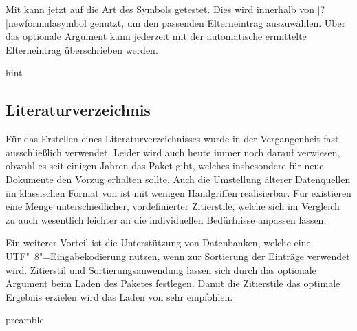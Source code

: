 \documentclass[%
  english,ngerman,%
  cdgeometry=no,DIV=12,%
  cd=false,cdfont=false,cdtitle=true,%
  headings=normal,%
  automark,%
  listof=toc,%
]{tudscrartcl}
\begin{document}
Mit  kann jetzt auf die Art des Symbols getestet. Dies 
wird innerhalb von \Macro|?|{newformulasymbol} genutzt, um den passenden 
Elterneintrag auszuwählen. Über das optionale Argument kann jederzeit mit 
 der automatische ermittelte 
Elterneintrag überschrieben werden.
%
\begin{Code}{hint}
\newcommand*\symbollettergroup{}
\newcommand*\newformulasymbol[5][]{%
  \ifisgreeksymbol{#4}{%
    \renewcommand*\symbollettergroup{greekletters}%
  }{%
    \renewcommand*\symbollettergroup{romanletters}%
  }%
  \newglossaryentry{#2}{%
    type=symbols,%
    name={#3},%
    description={\nopostdesc},%
    symbol={\ensuremath{#4}},%
    user1={\ensuremath{\mathrm{#5}}},%
    sort={#2},%
    parent={\symbollettergroup},%
    #1%
  }%
}
\end{Code}



\subsection{%
  Literaturverzeichnis%
  \label{sec:biblatex}%
}

Für das Erstellen eines Literaturverzeichnisses wurde in der Vergangenheit fast 
ausschließlich  verwendet. Leider wird auch heute immer noch 
darauf verwiesen, obwohl es seit einigen Jahren das Paket  
gibt, welches insbesondere für neue Dokumente den Vorzug erhalten sollte. Auch 
die Umstellung älterer Datenquellen im klassischen Format von 
ist mit wenigen Handgriffen realisierbar. Für  existieren 
eine Menge unterschiedlicher, vordefinierter Zitierstile, welche sich im 
Vergleich zu  auch wesentlich leichter an die individuellen 
Bedürfnisse anpassen lassen.

Ein weiterer Vorteil ist die Unterstützung von Datenbanken, welche eine 
UTF"~8"=Eingabekodierung nutzen, wenn  zur Sortierung der 
Einträge verwendet wird. Zitierstil und Sortierungsanwendung lassen sich 
durch das optionale Argument beim Laden des Paketes festlegen. Damit die 
Zitierstile das optimale Ergebnis erzielen wird das Laden von 
 sehr empfohlen.
%
\begin{Code}{preamble}
\usepackage{csquotes}
\usepackage[backend=biber,style=alphabetic]{biblatex}

\end{Code}
\end{document}
